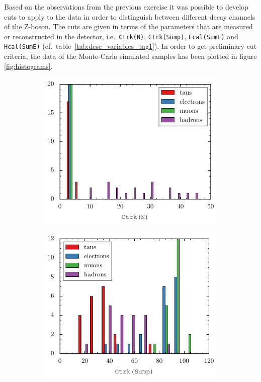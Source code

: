 \documentclass[11pt, a4paper]{article}
\numberwithin{equation}{section}
\begin{document}
Based on the observations from the previous exercise it was possible to develop cuts to apply to the data in order to distinguish between different decay channels of the Z-boson.
The cuts are given in terms of the parameters that are measured or reconstructed in the detector, i.e.\ \texttt{Ctrk(N)}, \texttt{Ctrk(Sump)}, \texttt{Ecal(SumE)} and \texttt{Hcal(SumE)} (cf.\ table~\ref{tab:desc_variables_tag1}).
In order to get preliminary cut criteria, the data of the Monte-Carlo simulated samples has been plotted in figure \ref{fig:histograms}.
\begin{figure}[htb]
	\begin{subfigure}{.5\textwidth}
		\centering
		\includegraphics[width=\textwidth]{./figures/event_display/Ctrk(N)}

	\end{subfigure}
	\begin{subfigure}{.5\textwidth}
		\centering
		\includegraphics[width=\textwidth]{./figures/event_display/Ctrk(SumP)}


\end{subfigure}
\end{figure}
\end{document}
